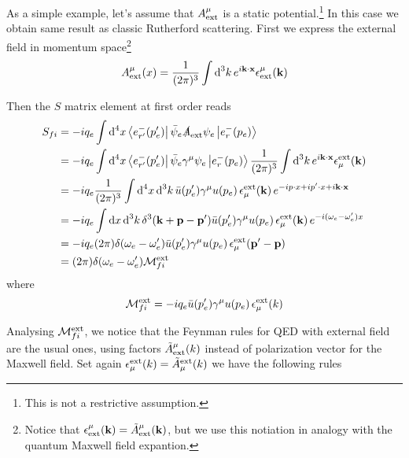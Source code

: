 \documentclass[TheoreticalPhy_ModB.tex]{subfiles}
\begin{document}
As a simple example, let's assume that $A_{\textup{ext}}^\mu$ is a static potential.\footnote{This is not a restrictive assumption.} In this case we obtain same result as classic Rutherford scattering. First we express the external field in momentum space\footnote{Notice that $\epsilon_{\textup{ext}}^\mu(\vec k)=\tilde A_{\textup{ext}}^\mu(\vec k)$, but we use this notiation in analogy with the quantum Maxwell field expantion.}
\[A_{\textup{ext}}^\mu(x)=\frac1{(2\pi)^3}\int\de^3k\,e^{i\vec k\cdot\vec x}\epsilon_{\textup{ext}}^\mu(\vec k)\]

Then the $S$ matrix element at first order reads
\begin{align*}
S_{fi}&=
-iq_e\int\de^4x\bra{e_{r'}^-(p_e')}\bar\psi_e\slashed A_{\textup{ext}}\psi_e\ket{e_{r}^-(p_e)}\\
&=-iq_e\int\de^4x\bra{e_{r'}^-(p_e')}\bar\psi_e\gamma^\mu\psi_e\ket{e_{r}^-(p_e)}
\frac1{(2\pi)^3}\int\de^3k\,e^{i\vec k\cdot\vec x}\epsilon_\mu^{\textup{ext}}(\vec k)\\
&=-iq_e\frac{1}{(2\pi)^3}\int\de^4x\,\de^3k\,\bar u(p_e')\gamma^\mu u(p_e)
\,\epsilon_\mu^{\textup{ext}}(\vec k)\,e^{-ip\cdot x+ip'\cdot x +i\vec k\cdot\vec x}\\
&=-iq_e\int\de x\,\de^3k\,\delta^3(\vec k+\vec p-\vec p')\bar u(p_e')\gamma^\mu u(p_e)
\,\epsilon_\mu^{\textup{ext}}(\vec k)\,e^{-i(\omega_e-\omega_e')x}\\
&=-iq_e(2\pi)\delta(\omega_e-\omega_e')\bar u(p_e')\gamma^\mu u(p_e)
\,\epsilon_\mu^{\textup{ext}}(\vec p'-\vec p)\\
&=(2\pi)\delta(\omega_e-\omega_e')\mathcal M_{fi}^{\textup{ext}}
\end{align*}
where
\[ \mathcal M_{fi}^{\textup{ext}}=-iq_e\bar u(p_e')\gamma^\mu u(p_e)
\,\epsilon_\mu^{\textup{ext}}(k)\]

Analysing $\mathcal M_{fi}^{\textup{ext}}$, we notice that the Feynman rules for QED with external field are the usual ones, using factors $\tilde A_{\textup{ext}}^\mu(k)$ instead of polarization vector for the Maxwell field. Set again $\epsilon_\mu^{\textup{ext}}(k)=\tilde A^{\textup{ext}}_\mu(k)$ we have the following rules
\end{document}
